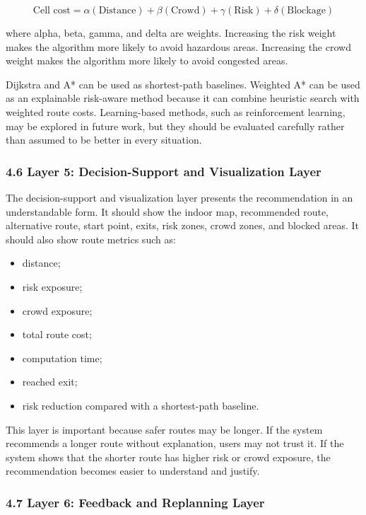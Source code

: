 \documentclass[
]{article}
\providecommand{\tightlist}{%
  \setlength{\itemsep}{0pt}\setlength{\parskip}{0pt}}
\begin{document}
\[
\text{Cell cost} =
\alpha(\text{Distance}) + \beta(\text{Crowd})
+ \gamma(\text{Risk}) + \delta(\text{Blockage})
\]

where alpha, beta, gamma, and delta are weights. Increasing the risk
weight makes the algorithm more likely to avoid hazardous areas.
Increasing the crowd weight makes the algorithm more likely to avoid
congested areas.

Dijkstra and A* can be used as shortest-path baselines. Weighted A* can
be used as an explainable risk-aware method because it can combine
heuristic search with weighted route costs. Learning-based methods, such
as reinforcement learning, may be explored in future work, but they
should be evaluated carefully rather than assumed to be better in every
situation.

\subsubsection{4.6 Layer 5: Decision-Support and Visualization
Layer}\label{layer-5-decision-support-and-visualization-layer}

The decision-support and visualization layer presents the recommendation
in an understandable form. It should show the indoor map, recommended
route, alternative route, start point, exits, risk zones, crowd zones,
and blocked areas. It should also show route metrics such as:

\begin{itemize}
\tightlist
\item
  distance;
\item
  risk exposure;
\item
  crowd exposure;
\item
  total route cost;
\item
  computation time;
\item
  reached exit;
\item
  risk reduction compared with a shortest-path baseline.
\end{itemize}

This layer is important because safer routes may be longer. If the
system recommends a longer route without explanation, users may not
trust it. If the system shows that the shorter route has higher risk or
crowd exposure, the recommendation becomes easier to understand and
justify.

\subsubsection{4.7 Layer 6: Feedback and Replanning
Layer}\label{layer-6-feedback-and-replanning-layer}
\end{document}
